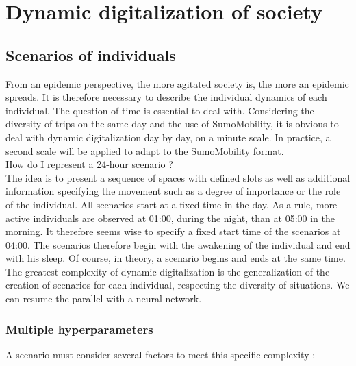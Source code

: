 \chapter{Dynamic digitalization of society}

\section{Scenarios of individuals}

From an epidemic perspective, the more agitated society is, the more an epidemic spreads. It is therefore necessary to describe the individual dynamics of each individual. The question of time is essential to deal with. Considering the diversity of trips on the same day and the use of SumoMobility, it is obvious to deal with dynamic digitalization day by day, on a minute scale. In practice, a second scale will be applied to adapt to the SumoMobility format.\\

How do I represent a 24-hour scenario ?\\

The idea is to present a sequence of spaces with defined slots as well as additional information specifying the movement such as a degree of importance or the role of the individual. All scenarios start at a fixed time in the day. As a rule, more active individuals are observed at 01:00, during the night, than at 05:00 in the morning. It therefore seems wise to specify a fixed start time of the scenarios at 04:00. The scenarios therefore begin with the awakening of the individual and end with his sleep. Of course, in theory, a scenario begins and ends at the same time. The greatest complexity of dynamic digitalization is the generalization of the creation of scenarios for each individual, respecting the diversity of situations. We can resume the parallel with a neural network.\\

\subsection{Multiple hyperparameters}

A scenario must consider several factors to meet this specific complexity :\\

